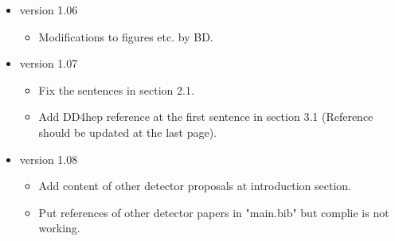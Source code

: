 \begin{itemize}
\item version 1.06
\begin{itemize}
\item Modifications to figures etc. by BD. 
\end{itemize}

\item version 1.07
\begin{itemize}
\item Fix the sentences in section 2.1.
\item Add DD4hep reference at the first sentence in section 3.1 (Reference should be updated at the last page). 
\end{itemize}

\item version 1.08
\begin{itemize}
\item Add content of other detector proposals at introduction section.
\item Put references of other detector papers in "main.bib" but complie is not working.
\end{itemize}

\end{itemize}

\clearpage

